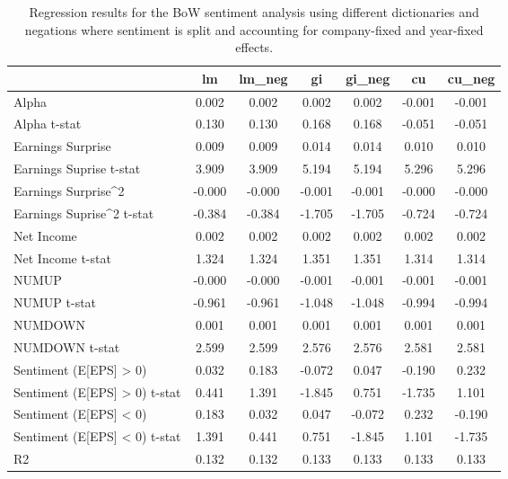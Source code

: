 \begin{table}
\caption{Regression results for the BoW sentiment analysis using different dictionaries and negations where sentiment is split and accounting for company-fixed and year-fixed effects.}
\label{tab:bow_regressions_split_company_and_year_fixed}
\begin{tabular}{lcccccc}
\toprule
 & lm & lm_neg & gi & gi_neg & cu & cu_neg \\
\midrule
Alpha & 0.002 & 0.002 & 0.002 & 0.002 & -0.001 & -0.001 \\
Alpha t-stat & 0.130 & 0.130 & 0.168 & 0.168 & -0.051 & -0.051 \\
Earnings Surprise & 0.009 & 0.009 & 0.014 & 0.014 & 0.010 & 0.010 \\
Earnings Suprise t-stat & 3.909 & 3.909 & 5.194 & 5.194 & 5.296 & 5.296 \\
Earnings Surprise^2 & -0.000 & -0.000 & -0.001 & -0.001 & -0.000 & -0.000 \\
Earnings Suprise^2 t-stat & -0.384 & -0.384 & -1.705 & -1.705 & -0.724 & -0.724 \\
Net Income & 0.002 & 0.002 & 0.002 & 0.002 & 0.002 & 0.002 \\
Net Income t-stat & 1.324 & 1.324 & 1.351 & 1.351 & 1.314 & 1.314 \\
NUMUP & -0.000 & -0.000 & -0.001 & -0.001 & -0.001 & -0.001 \\
NUMUP t-stat & -0.961 & -0.961 & -1.048 & -1.048 & -0.994 & -0.994 \\
NUMDOWN & 0.001 & 0.001 & 0.001 & 0.001 & 0.001 & 0.001 \\
NUMDOWN t-stat & 2.599 & 2.599 & 2.576 & 2.576 & 2.581 & 2.581 \\
Sentiment (E[EPS] > 0) & 0.032 & 0.183 & -0.072 & 0.047 & -0.190 & 0.232 \\
Sentiment (E[EPS] > 0) t-stat & 0.441 & 1.391 & -1.845 & 0.751 & -1.735 & 1.101 \\
Sentiment (E[EPS] < 0) & 0.183 & 0.032 & 0.047 & -0.072 & 0.232 & -0.190 \\
Sentiment (E[EPS] < 0) t-stat & 1.391 & 0.441 & 0.751 & -1.845 & 1.101 & -1.735 \\
R2 & 0.132 & 0.132 & 0.133 & 0.133 & 0.133 & 0.133 \\
\bottomrule
\end{tabular}
\end{table}
